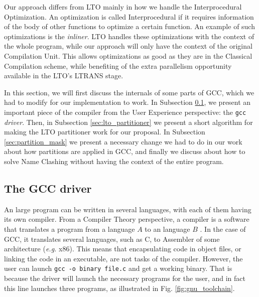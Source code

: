 \documentclass[runningheads]{llncs}
\begin{document}
Our approach differs from LTO mainly in how we handle the Interprocedural
Optimization. An optimization is called Interprocedural if it requires
information of the body of other functions to optimize a certain function.
An example of such optimizations is the \textit{inliner}.
LTO handles these optimizations with the context of the whole program, while
our approach will only have the context of the original Compilation Unit.
This allows optimizations as good as they are in the Classical
Compilation scheme, while benefiting of the extra parallelism opportunity
available in the LTO's LTRANS stage.

In this section, we will first discuss the internals of some parts of GCC,
which we had to modify for our implementation to work. In Subsection
\ref{sec:gcc_driver}, we present an important piece of the compiler from the
User Experience perspective: the \texttt{gcc} \textit{driver}. Then, in
Subsection \ref{sec:lto_partitioner} we present a short algorithm for making
the LTO partitioner work for our proposal. In Subsection
\ref{sec:partition_mask} we present a necessary change we had to do in our work
about how partitions are applied in GCC, and finally we discuss about how to
solve Name Clashing without having the context of the entire program.

\subsection{The GCC driver}\label{sec:gcc_driver}

An large program can be written in several languages, with each of them having
its own compiler. From a Compiler Theory perspective, a compiler is a software
that translates a program from a language $A$ to an language $B$
\cite{dragonbook}.  In the case of GCC, it translates several languages, such
as C, to Assembler of some architecture (\textit{e.g.} x86). This means that
encapsulating code in object files, or linking the code in an executable, are
not tasks of the compiler. However, the user can launch \texttt{gcc -o binary
file.c} and get a working binary. That is because the driver will launch the
necessary programs for the user, and in fact this line launches three programs,
as illustrated in Fig. \ref{fig:gnu_toolchain}.
\end{document}
